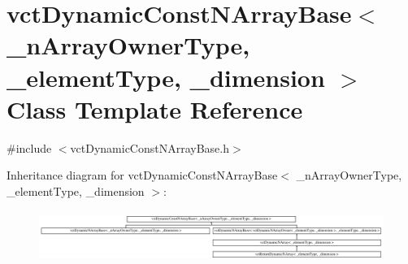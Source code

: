 \hypertarget{classvct_dynamic_const_n_array_base}{}\section{vct\+Dynamic\+Const\+N\+Array\+Base$<$ \+\_\+n\+Array\+Owner\+Type, \+\_\+element\+Type, \+\_\+dimension $>$ Class Template Reference}
\label{classvct_dynamic_const_n_array_base}


{\ttfamily \#include $<$vct\+Dynamic\+Const\+N\+Array\+Base.\+h$>$}

Inheritance diagram for vct\+Dynamic\+Const\+N\+Array\+Base$<$ \+\_\+n\+Array\+Owner\+Type, \+\_\+element\+Type, \+\_\+dimension $>$\+:\begin{figure}[H]
\begin{center}
\leavevmode
\includegraphics[height=1.699545cm]{dd/d8c/classvct_dynamic_const_n_array_base}
\end{center}
\end{figure}
